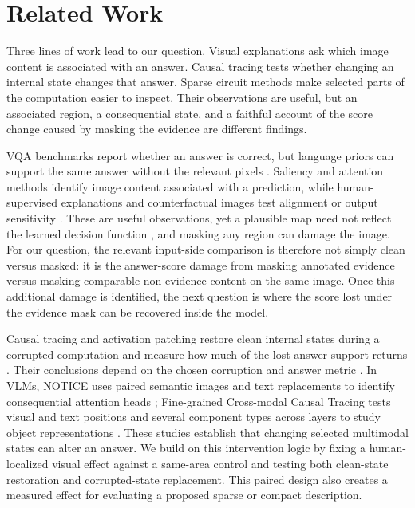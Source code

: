 \section{Related Work}

Three lines of work lead to our question. Visual explanations ask which image content is associated with an answer. Causal tracing tests whether changing an internal state changes that answer. Sparse circuit methods make selected parts of the computation easier to inspect. Their observations are useful, but an associated region, a consequential state, and a faithful account of the score change caused by masking the evidence are different findings.

VQA benchmarks report whether an answer is correct, but language priors can support the same answer without the relevant pixels \citep{antol2015vqa,goyal2017vqav2,agrawal2018vqacp}. Saliency and attention methods identify image content associated with a prediction, while human-supervised explanations and counterfactual images test alignment or output sensitivity \citep{selvaraju2017gradcam,jain2019attention,selvaraju2019hint,goyal2019counterfactual}. These are useful observations, yet a plausible map need not reflect the learned decision function \citep{adebayo2018sanity}, and masking any region can damage the image. For our question, the relevant input-side comparison is therefore not simply clean versus masked: it is the answer-score damage from masking annotated evidence versus masking comparable non-evidence content on the same image. Once this additional damage is identified, the next question is where the score lost under the evidence mask can be recovered inside the model.

Causal tracing and activation patching restore clean internal states during a corrupted computation and measure how much of the lost answer support returns \citep{vig2020causalMediation,meng2022rome,wang2023ioi}. Their conclusions depend on the chosen corruption and answer metric \citep{zhang2024patching}. In VLMs, NOTICE uses paired semantic images and text replacements to identify consequential attention heads \citep{golovanevsky2025notice}; Fine-grained Cross-modal Causal Tracing tests visual and text positions and several component types across layers to study object representations \citep{li2026causalTracing}. These studies establish that changing selected multimodal states can alter an answer. We build on this intervention logic by fixing a human-localized visual effect against a same-area control and testing both clean-state restoration and corrupted-state replacement. This paired design also creates a measured effect for evaluating a proposed sparse or compact description.

